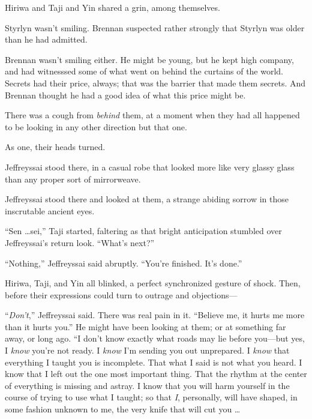 {
 Hiriwa and Taji and Yin shared a grin, among themselves.}

{
 Styrlyn wasn't smiling. Brennan suspected rather
strongly that Styrlyn was older than he had admitted.}

{
 Brennan wasn't smiling either. He might be young,
but he kept high company, and had witnesssed some of what went on
behind the curtains of the world. Secrets had their price, always; that
was the barrier that made them secrets. And Brennan thought he had a
good idea of what this price might be.}

{
 There was a cough from \textit{behind} them, at a moment when they
had all happened to be looking in any other direction but that one.}

{
 As one, their heads turned.}

{
 Jeffreyssai stood there, in a casual robe that looked more like
very glassy glass than any proper sort of mirrorweave.}

{
 Jeffreyssai stood there and looked at them, a strange abiding
sorrow in those inscrutable ancient eyes.}

{
 ``Sen \ldots sei,'' Taji
started, faltering as that bright anticipation stumbled over
Jeffreyssai's return look.
``What's next?''}

{
 ``Nothing,'' Jeffreyssai said
abruptly. ``You're finished.
It's done.''}

{
 Hiriwa, Taji, and Yin all blinked, a perfect synchronized gesture
of shock. Then, before their expressions could turn to outrage and
objections---}

{
 ``\textit{Don't},''
Jeffreyssai said. There was real pain in it. ``Believe
me, it hurts me more than it hurts you.'' He might
have been looking at them; or at something far away, or long ago.
``I don't know exactly what roads may
lie before you---but yes, I \textit{know} you're not
ready. I \textit{know} I'm sending you out unprepared.
I \textit{know} that everything I taught you is incomplete. That what I
said is not what you heard. I know that I left out the one most
important thing. That the rhythm at the center of everything is missing
and astray. I know that you will harm yourself in the course of trying
to use what I taught; so that \textit{I}, personally, will have shaped,
in some fashion unknown to me, the very knife that will cut you \ldots}

